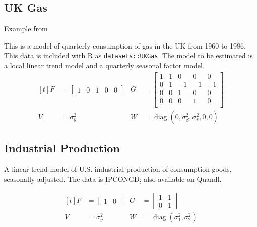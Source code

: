 \documentclass{article}\usepackage[]{graphicx}\usepackage[]{color}
\newcommand{\Rlang}{\textsf{R}}
\DeclareMathOperator{\diag}{diag}
\begin{document}
\subsection{UK Gas}

Example from 

This is a model of quarterly consumption of gas in the UK from 1960 to 1986.
This data is included with \Rlang{} as \texttt{datasets::UKGas}.
The model to be estimated is a local linear trend model and a quarterly seasonal factor model.
\begin{equation*}
  \begin{aligned}[t]
    F &=
    \begin{bmatrix}
      1 & 0 & 1 & 0 & 0 
    \end{bmatrix}
    & 
    G &=
    \begin{bmatrix}
      1 & 1 & 0 & 0 & 0  \\
      0 & 1 & -1 & -1 & -1 \\
      0 & 0 & 1 & 0 & 0 \\
      0 & 0 & 0 & 1 & 0 \\
    \end{bmatrix}
    \\
    V & = \sigma_{y}^{2} &
    W & = \diag (0, \sigma_{\beta}^{2}, \sigma_{s}^{2}, 0, 0) 
  \end{aligned}
\end{equation*}

\subsection{Industrial Production}

A linear trend model of U.S. industrial production of consumption goods, seasonally adjusted.
The data is \href{http://research.stlouisfed.org/fred2/series/IPCONGD}{IPCONGD}; also available on \href{http://www.quandl.com/FRED/IPCONGD}{Quandl}.

\begin{equation*}
  \begin{aligned}[t]
    F &=
    \begin{bmatrix}
      1 & 0 
    \end{bmatrix}
    & 
    G &=
    \begin{bmatrix}
      1 & 1 \\
      0 & 1 
    \end{bmatrix}
    \\
    V & = \sigma_{y}^{2} &
    W & = \diag (\sigma_{1}^{2}, \sigma_{2}^{2})
  \end{aligned}
\end{equation*}
\end{document}
